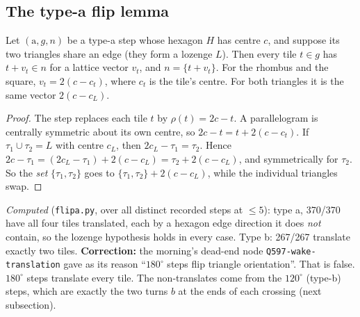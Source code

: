 \documentclass[11pt]{article}
\theoremstyle{definition}\newtheorem{definition}[theorem]{Definition}\newtheorem{remark}[theorem]{Remark}
\begin{document}
\subsection{The type-a flip lemma}
\begin{lemma}\label{lem:flipa}
Let $(\mathrm a,g,n)$ be a type-a step whose hexagon $H$ has centre $c$, and suppose its two triangles share an edge (they form a lozenge $L$). Then every tile $t\in g$ has $t+v_t\in n$ for a lattice vector $v_t$, and $n=\{t+v_t\}$.
For the rhombus and the square, $v_t=2(c-c_t)$, where $c_t$ is the tile's centre. For both triangles it is the same vector $2(c-c_L)$.
\end{lemma}
\begin{proof}
The step replaces each tile $t$ by $\rho(t)=2c-t$. A parallelogram is centrally symmetric about its own centre, so $2c-t=t+2(c-c_t)$. If $\tau_1\cup\tau_2=L$ with centre $c_L$, then $2c_L-\tau_1=\tau_2$.
Hence $2c-\tau_1=(2c_L-\tau_1)+2(c-c_L)=\tau_2+2(c-c_L)$, and symmetrically for $\tau_2$. So the \emph{set} $\{\tau_1,\tau_2\}$ goes to $\{\tau_1,\tau_2\}+2(c-c_L)$, while the individual triangles swap.
\end{proof}
\noindent\emph{Computed} (\texttt{flipa.py}, over all distinct recorded steps at $\le5$): type a, 370/370 have all four tiles translated, each by a hexagon edge direction it does \emph{not} contain, so the lozenge hypothesis holds in every case.
Type b: 267/267 translate exactly two tiles. \textbf{Correction:} the morning's dead-end node \texttt{Q597-wake-translation} gave as its reason ``$180^\circ$ steps flip triangle orientation''.
That is false. $180^\circ$ steps translate every tile. The non-translates come from the $120^\circ$ (type-b) steps, which are exactly the two turns $b$ at the ends of each crossing (next subsection).
\end{document}
